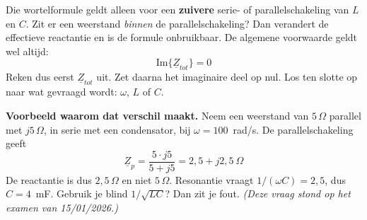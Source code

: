 \documentclass[a4paper,11pt]{article}
\begin{document}
Die wortelformule geldt alleen voor een \textbf{zuivere} serie- of parallelschakeling van $L$ en
$C$. Zit er een weerstand \emph{binnen} de parallelschakeling? Dan verandert de effectieve
reactantie en is de formule onbruikbaar. De algemene voorwaarde geldt wel altijd:
\[\text{Im}\{\underline{Z}_{tot}\} = 0\]
Reken dus eerst $\underline{Z}_{tot}$ uit. Zet daarna het imaginaire deel op nul. Los ten slotte op
naar wat gevraagd wordt: $\omega$, $L$ of $C$.

\textbf{Voorbeeld waarom dat verschil maakt.} Neem een weerstand van $5\,\Omega$ parallel met
$j5\,\Omega$, in serie met een condensator, bij $\omega = 100$~rad/s. De parallelschakeling geeft
\[\underline{Z}_p = \frac{5 \cdot j5}{5 + j5} = 2{,}5 + j2{,}5\ \Omega\]
De reactantie is dus $2{,}5\,\Omega$ en niet $5\,\Omega$. Resonantie vraagt
$1/(\omega C) = 2{,}5$, dus $C = 4$~mF. Gebruik je blind $1/\sqrt{LC}$? Dan zit je fout.
\emph{(Deze vraag stond op het examen van 15/01/2026.)}
\end{document}
